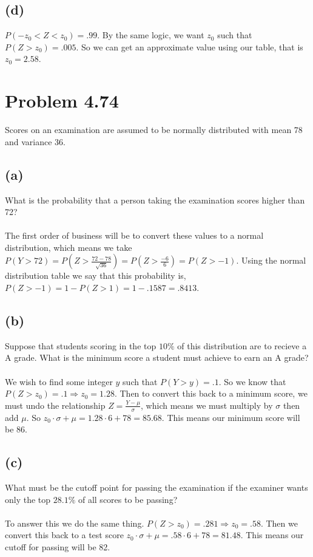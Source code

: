 \documentclass{article}
\theoremstyle{definition}
\begin{document}
    \subsection*{(d)}
        $P(-z_0 < Z < z_0) = .99$. By the same logic, we want $z_0$ such that $P(Z > z_0)
        = .005$. So we can get an approximate value using our table, that is $z_0 = 2.58$.

\section*{Problem 4.74}
    Scores on an examination are assumed to be normally distributed with mean 78 and 
    variance 36.

    \subsection*{(a)}
        What is the probability that a person taking the examination scores higher than
        72?\\\\
        The first order of business will be to convert these values to a normal distribution,
        which means we take $P(Y > 72) = P(Z > \frac{72 - 78}{\sqrt{36}}) = P(Z > \frac{-6}
        {6}) = P(Z > -1)$. Using the normal distribution table we say that this probability is,
        $P(Z > -1) = 1 - P(Z > 1) = 1 - .1587 = .8413$.

    \subsection*{(b)}
        Suppose that students scoring in the top $10\%$ of this distribution are to
        recieve a A grade. What is the minimum score a student must achieve to earn an
        A grade?\\\\
        We wish to find some integer $y$ such that $P(Y > y) = .1$. So we know that $P(Z >
        z_0) = .1 \Longrightarrow z_0 = 1.28$. Then to convert this back to a minimum score,
        we must undo the relationship $Z = \frac{Y - \mu}{\sigma}$, which means we must
        multiply by $\sigma$ then add $\mu$. So $z_0 \cdot \sigma + \mu = 1.28 \cdot 6 + 
        78 = 85.68$. This means our minimum score will be $86$.

    \subsection*{(c)}
        What must be the cutoff point for passing the examination if the examiner
        wants only the top $28.1\%$ of all scores to be passing?\\\\
        To answer this we do the same thing. $P(Z > z_0) = .281 \Longrightarrow z_0
        = .58$. Then we convert this back to a test score $z_0 \cdot \sigma + \mu = 
        .58 \cdot 6 + 78 = 81.48$. This means our cutoff for passing will be 82.
\end{document}
